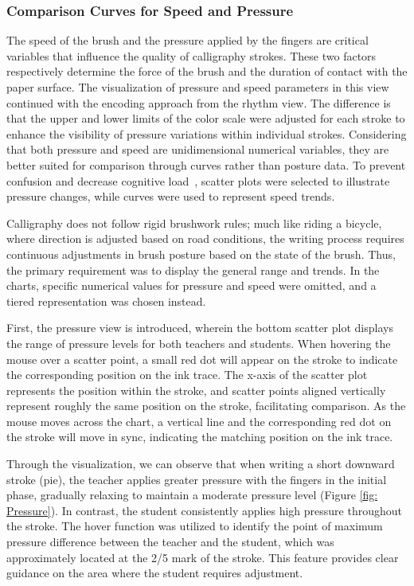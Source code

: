 \subsubsection{Comparison Curves for Speed and Pressure}
The speed of the brush and the pressure applied by the fingers are critical variables that influence the quality of calligraphy strokes. These two factors respectively determine the force of the brush and the duration of contact with the paper surface. The visualization of pressure and speed parameters in this view continued with the encoding approach from the rhythm view. The difference is that the upper and lower limits of the color scale were adjusted for each stroke to enhance the visibility of pressure variations within individual strokes. Considering that both pressure and speed are unidimensional numerical variables, they are better suited for comparison through curves rather than posture data. To prevent confusion and decrease cognitive load~\cite{keller2006information}, scatter plots were selected to illustrate pressure changes, while curves were used to represent speed trends.

Calligraphy does not follow rigid brushwork rules; much like riding a bicycle, where direction is adjusted based on road conditions, the writing process requires continuous adjustments in brush posture based on the state of the brush. Thus, the primary requirement was to display the general range and trends. In the charts, specific numerical values for pressure and speed were omitted, and a tiered representation was chosen instead.

First, the pressure view is introduced, wherein the bottom scatter plot displays the range of pressure levels for both teachers and students. When hovering the mouse over a scatter point, a small red dot will appear on the stroke to indicate the corresponding position on the ink trace. The x-axis of the scatter plot represents the position within the stroke, and scatter points aligned vertically represent roughly the same position on the stroke, facilitating comparison. As the mouse moves across the chart, a vertical line and the corresponding red dot on the stroke will move in sync, indicating the matching position on the ink trace.

Through the visualization, we can observe that when writing a short downward stroke (pie), the teacher applies greater pressure with the fingers in the initial phase, gradually relaxing to maintain a moderate pressure level (Figure \ref{fig: Pressure}). In contrast, the student consistently applies high pressure throughout the stroke. The hover function was utilized to identify the point of maximum pressure difference between the teacher and the student, which was approximately located at the 2/5 mark of the stroke. This feature provides clear guidance on the area where the student requires adjustment.

